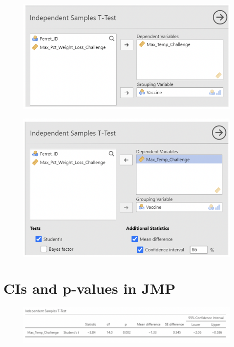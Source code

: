\documentclass[
  letterpaper,
  DIV=11,
  numbers=noendperiod]{scrreprt}
\begin{document}
\begin{figure}

{\centering \includegraphics{images/mod1_18.png}

}

\end{figure}

\begin{figure}

{\centering \includegraphics{images/mod1_19.png}

}

\end{figure}

\hypertarget{cis-and-p-values-in-jmp}{%
\section{CIs and p-values in JMP}\label{cis-and-p-values-in-jmp}}

\begin{figure}

{\centering \includegraphics{images/mod1_20.png}

}

\end{figure}
\end{document}
